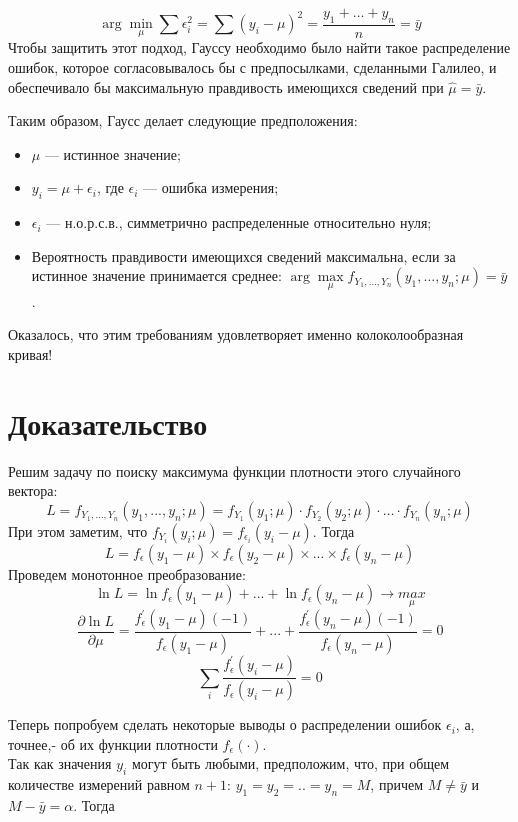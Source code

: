 \documentclass[a4paper,12pt]{article}
\begin{document}
	\[
	\arg \min\limits_{\mu} \sum \epsilon_i^2 = \sum (y_i - \mu)^2 = \frac{y_1 + \ldots + y_n}{n} = \bar y
	\]
	Чтобы защитить этот подход, Гауссу необходимо было найти такое распределение ошибок, которое согласовывалось бы с предпосылками, сделанными Галилео, и обеспечивало бы максимальную правдивость имеющихся сведений при $\hat\mu = \bar y$. 
	
	Таким образом, {\selectfont Гаусс делает следующие предположения:}
	\begin{itemize}
		\item $\mu$ --- истинное значение;
		\item $y_i = \mu + \epsilon_i$, где $\epsilon_i$ --- ошибка измерения;
		\item $\epsilon_i$ --- н.о.р.с.в., симметрично распределенные относительно нуля;
		\item Вероятность правдивости имеющихся сведений максимальна, если за истинное значение принимается среднее: $\arg\max\limits_{\mu} f_{Y_1, \ldots, Y_n}(y_1, \ldots, y_n; \mu) = \bar{y}$ .
	\end{itemize}
	
	Оказалось, что этим требованиям удовлетворяет именно колоколообразная кривая!
	\section*{Доказательство}
	Решим задачу по поиску максимума функции плотности этого случайного вектора:
	\[ L = f_{Y_1,..., Y_n}(y_1, ..., y_n; \mu) = f_{Y_1}(y_1; \mu) \cdot f_{Y_2}(y_2; \mu) \cdot \ldots \cdot f_{Y_n}(y_n; \mu)\] 
	При этом заметим, что $f_{Y_i}(y_i; \mu) = f_{\epsilon_i}(y_i - \mu)$. Тогда 
	\[ L = f_{\epsilon}(y_1 - \mu) \times f_{\epsilon}(y_2 - \mu) \times ... \times f_{\epsilon}(y_n - \mu)\]
	Проведем монотонное преобразование:
	\[ \ln L = \ln f_{\epsilon}(y_1 - \mu) + ... +  \ln f_{\epsilon}(y_n - \mu) \rightarrow \underset{\mu}{max} \]
	\[ \frac{\partial \ln L}{\partial \mu} = \frac{f_{\epsilon}^{'}(y_1 - \mu)(-1)}{f_{\epsilon}(y_1 - \mu)} + ... + \frac{f_{\epsilon}^{'}(y_n - \mu)(-1)}{f_{\epsilon}(y_n - \mu)} = 0\]
	\[ \sum_i{\frac{f_{\epsilon}^{'}(y_i - \mu)}{f_{\epsilon}(y_i - \mu)}} = 0\]
	
	Теперь попробуем сделать некоторые выводы о распределении ошибок $\epsilon_i$, а, точнее,- об их функции плотности  $f_\epsilon(\cdot)$. \\
	
	Так как значения $y_i$ могут быть любыми, предположим, что, при общем количестве измерений равном $n + 1$:
	$y_1 = y_2 = .. = y_n = M$, причем $M \neq \bar{y}$ и $M - \bar{y} = \alpha$. Тогда
	
\end{document}
